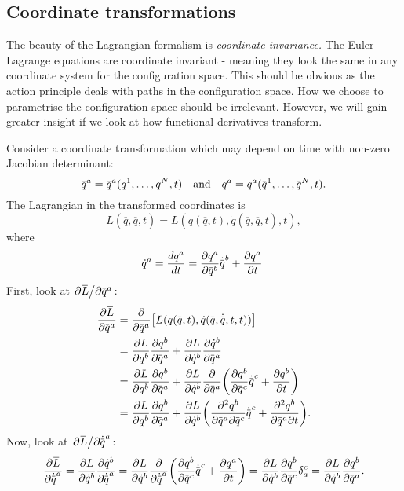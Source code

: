 \documentclass{article}
\begin{document}
\subsection{Coordinate transformations}
The beauty of the Lagrangian formalism is \textit{coordinate invariance.} The Euler-Lagrange equations are coordinate invariant - meaning they look the same in any coordinate system for the configuration space. This should be obvious as the action principle deals with paths in the configuration space. How we choose to parametrise the configuration space should be irrelevant. However, we will gain greater insight if we look at how functional derivatives transform.
\par
Consider a coordinate transformation which may depend on time with non-zero Jacobian determinant:
\begin{equation} \label{eq:211}
    \overbar{q}^a = \overbar{q}^a(q^1,\dots,q^N,t) \qq{and} q^a = q^a(\overbar{q}^1,\dots,\overbar{q}^N,t).
\end{equation}
The Lagrangian in the transformed coordinates is
\begin{equation}
    \overbar{L}(\overbar{q},\dot{\overbar{q}},t) = L(q(\overbar{q},t), \dot{q}(\overbar{q},\dot{\overbar{q}},t),t),
\end{equation}
where
\begin{equation}
    \dot{q}^a = \dv{q^a}{t} = \pdv{q^a}{\overbar{q}^b} \dot{\overbar{q}}^b + \pdv{q^a}{t}.
\end{equation}
First, look at $\pdv*{\overbar{L}}{\overbar{q}^a}$:
\begin{align} \label{eq:214}
    \begin{split}
        \pdv{\overbar{L}}{\overbar{q}^a} &= \pdv{\overbar{q}^a} \qty[L(q(\overbar{q},t), \dot{q}(\overbar{q},\dot{\overbar{q}},t,t))] \\
        &= \pdv{L}{q^b}\pdv{q^b}{\overbar{q}^a} + \pdv{L}{\dot{q}^b}\pdv{\dot{q}^b}{\overbar{q}^a} \\
        &= \pdv{L}{q^b}\pdv{q^b}{\overbar{q}^a} + \pdv{L}{\dot{q}^b} \pdv{\overbar{q}^a} \qty(\pdv{q^b}{\overbar{q}^c} \dot{\overbar{q}}^c + \pdv{q^b}{t}) \\
        &= \pdv{L}{q^b}\pdv{q^b}{\overbar{q}^a} + \pdv{L}{\dot{q}^b}\qty( \pdv{q^b}{\overbar{q}^a}{ \overbar{q}^c} \dot{\overbar{q}}^c + \pdv{q^b}{\overbar{q}^a}{ t}).
    \end{split}
\end{align}
Now, look at $\pdv*{\overbar{L}}{\dot{\overbar{q}}^a}$:
\begin{equation}
    \pdv{\overbar{L}}{\dot{\overbar{q}}^a} = \pdv{L}{\dot{q}^b} \pdv{\dot{q}^b}{\dot{\overbar{q}}^a} = \pdv{L}{\dot{q}^b} \pdv{\dot{\overbar{q}}^a} \qty(\pdv{q^b}{\overbar{q}^c} \dot{\overbar{q}}^c + \pdv{q^a}{t}) = \pdv{L}{\dot{q}^b}\pdv{q^b}{\overbar{q}^c} \delta^c_a = \pdv{L}{\dot{q}^b} \pdv{q^b}{\overbar{q}^a}.
\end{equation}
\end{document}
